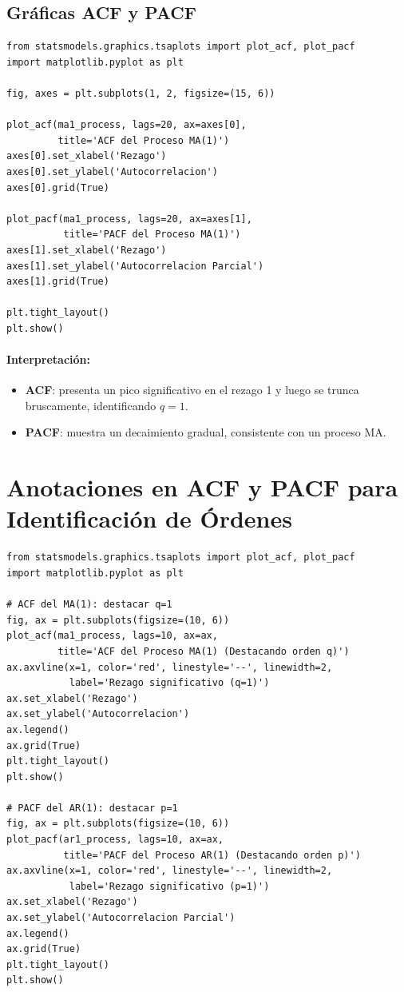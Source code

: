 \documentclass[12pt, a4paper]{article}
\begin{document}
\subsection{Gráficas ACF y PACF}

\begin{lstlisting}
from statsmodels.graphics.tsaplots import plot_acf, plot_pacf
import matplotlib.pyplot as plt

fig, axes = plt.subplots(1, 2, figsize=(15, 6))

plot_acf(ma1_process, lags=20, ax=axes[0],
         title='ACF del Proceso MA(1)')
axes[0].set_xlabel('Rezago')
axes[0].set_ylabel('Autocorrelacion')
axes[0].grid(True)

plot_pacf(ma1_process, lags=20, ax=axes[1],
          title='PACF del Proceso MA(1)')
axes[1].set_xlabel('Rezago')
axes[1].set_ylabel('Autocorrelacion Parcial')
axes[1].grid(True)

plt.tight_layout()
plt.show()
\end{lstlisting}

\paragraph{Interpretación:}
\begin{itemize}
  \item \textbf{ACF}: presenta un pico significativo en el rezago 1 y luego
        se trunca bruscamente, identificando $q=1$.
  \item \textbf{PACF}: muestra un decaimiento gradual, consistente con un
        proceso MA.
\end{itemize}

\section{Anotaciones en ACF y PACF para Identificación de Órdenes}

\begin{lstlisting}
from statsmodels.graphics.tsaplots import plot_acf, plot_pacf
import matplotlib.pyplot as plt

# ACF del MA(1): destacar q=1
fig, ax = plt.subplots(figsize=(10, 6))
plot_acf(ma1_process, lags=10, ax=ax,
         title='ACF del Proceso MA(1) (Destacando orden q)')
ax.axvline(x=1, color='red', linestyle='--', linewidth=2,
           label='Rezago significativo (q=1)')
ax.set_xlabel('Rezago')
ax.set_ylabel('Autocorrelacion')
ax.legend()
ax.grid(True)
plt.tight_layout()
plt.show()

# PACF del AR(1): destacar p=1
fig, ax = plt.subplots(figsize=(10, 6))
plot_pacf(ar1_process, lags=10, ax=ax,
          title='PACF del Proceso AR(1) (Destacando orden p)')
ax.axvline(x=1, color='red', linestyle='--', linewidth=2,
           label='Rezago significativo (p=1)')
ax.set_xlabel('Rezago')
ax.set_ylabel('Autocorrelacion Parcial')
ax.legend()
ax.grid(True)
plt.tight_layout()
plt.show()
\end{lstlisting}
\end{document}
